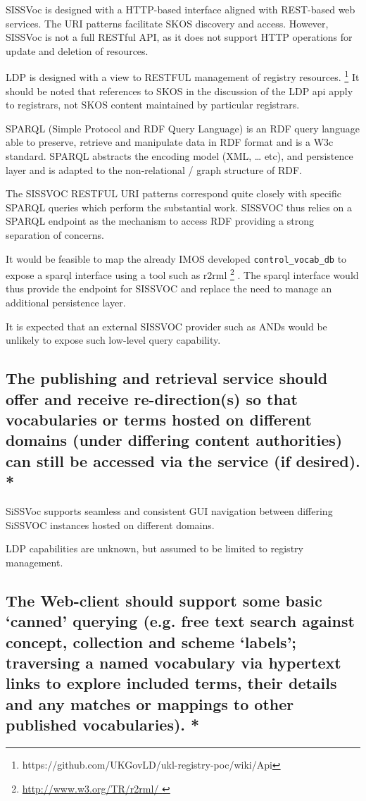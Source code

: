 \documentclass[10pt,a4paper]{article}
\begin{document}
\begin{flushleft}
    SISSVoc is designed with a HTTP-based interface aligned with REST-based web
services. The URI patterns facilitate SKOS discovery and access. However,
SISSVoc is not a full RESTful API, as it does not support HTTP operations for
update and deletion of resources.
    
    LDP is designed with a view to RESTFUL management of registry resources.
\footnote { https://github.com/UKGovLD/ukl-registry-poc/wiki/Api } It should be
noted that references to SKOS in the discussion of the LDP api apply to
registrars, not SKOS content maintained by particular registrars.  


    SPARQL (Simple Protocol and RDF Query Language) is an RDF query language
able to preserve, retrieve and manipulate data in RDF format and is a W3c
standard.  SPARQL abstracts the encoding model (XML, … etc), and persistence
layer and is adapted to the non-relational / graph structure of RDF.

    The SISSVOC RESTFUL URI patterns correspond quite closely with specific SPARQL queries
which perform the substantial work. SISSVOC thus relies on a SPARQL endpoint as the
mechanism to access RDF providing a strong separation of concerns.

    It would be feasible to map the already IMOS developed
\texttt{control\_vocab\_db} to expose a sparql interface using a tool such as
r2rml \footnote{ \url{ http://www.w3.org/TR/r2rml/ } } .  The sparql interface
would thus provide the endpoint for SISSVOC and replace the need to manage an
additional persistence layer.

    It is expected that an external SISSVOC provider such as ANDs would be
unlikely to expose such low-level query capability.
   

\subsection{ The publishing and retrieval service should offer and receive
re-direction(s) so that vocabularies or terms hosted on different domains (under
differing content authorities) can still be accessed via the service (if
desired). * }

SiSSVoc supports seamless and consistent GUI navigation between differing
SiSSVOC instances hosted on different domains.

LDP capabilities are unknown, but assumed to be limited to registry management.



\subsection{ The Web-client should support some basic ‘canned’ querying (e.g.
free text search against concept, collection and scheme ‘labels’; traversing a
named vocabulary via hypertext links to explore included terms, their details
and any matches or mappings to other published vocabularies). * }


\end{flushleft}
\end{document}
